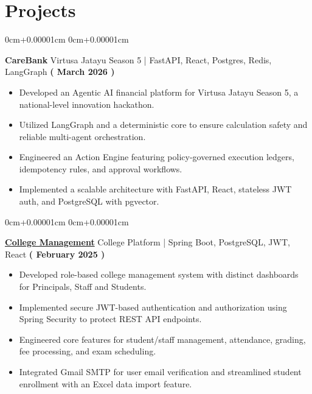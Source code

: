 \documentclass[10pt,a4paper]{article}
\newenvironment{highlights}{
    \begin{itemize}[
        topsep=0.10cm,
        parsep=0.10cm,
        partopsep=0pt,
        itemsep=0pt,
        leftmargin=10pt,
    ]
    }{
    \end{itemize}
}
\newenvironment{onecolentry}{
    \begin{adjustwidth}{
        0cm+0.00001cm
    }{
        0cm+0.00001cm
    }
    }{
    \end{adjustwidth}
}
\begin{document}
    \section{Projects}\label{sec:projects}
    \begin{onecolentry}
        \textbf{CareBank} Virtusa Jatayu Season 5 | FastAPI, React, Postgres, Redis, LangGraph \hfill \textbf{( March 2026 )} \\
        \begin{highlights}
            \item Developed an Agentic AI financial platform for Virtusa Jatayu Season 5, a national-level innovation hackathon.
            \item Utilized LangGraph and a deterministic core to ensure calculation safety and reliable multi-agent orchestration.
            \item Engineered an Action Engine featuring policy-governed execution ledgers, idempotency rules, and approval workflows.
            \item Implemented a scalable architecture with FastAPI, React, stateless JWT auth, and PostgreSQL with pgvector.
        \end{highlights}
    \end{onecolentry}
    \vspace{0.1cm}
    \begin{onecolentry}
        \textbf{\href{https://github.com/jefino9488/college-management-server}{College Management}} College Platform | Spring Boot, PostgreSQL, JWT, React \hfill \textbf{( February 2025 )} \\
        \begin{highlights}
            \item Developed role-based college management system with distinct dashboards for Principals, Staff and Students. \\
            \item Implemented secure JWT-based authentication and authorization using Spring Security to protect REST API endpoints. \\
            \item Engineered core features for student/staff management, attendance, grading, fee processing, and exam scheduling. \\
            \item Integrated Gmail SMTP for user email verification and streamlined student enrollment with an Excel data import feature. \\
        \end{highlights}
    \end{onecolentry}
\end{document}
